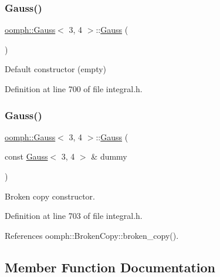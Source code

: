 \subsubsection{\texorpdfstring{Gauss()}{Gauss()}\hspace{0.1cm}{\footnotesize\ttfamily [1/2]}}
{\footnotesize\ttfamily \hyperlink{classoomph_1_1Gauss}{oomph\+::\+Gauss}$<$ 3, 4 $>$\+::\hyperlink{classoomph_1_1Gauss}{Gauss} (\begin{DoxyParamCaption}{ }\end{DoxyParamCaption})\hspace{0.3cm}{\ttfamily [inline]}}



Default constructor (empty) 



Definition at line 700 of file integral.\+h.

\mbox{\label{classoomph_1_1Gauss_3_013_00_014_01_4_a1e3cc4f3bd8e8d1d684671b80561647d}} 
\subsubsection{\texorpdfstring{Gauss()}{Gauss()}\hspace{0.1cm}{\footnotesize\ttfamily [2/2]}}
{\footnotesize\ttfamily \hyperlink{classoomph_1_1Gauss}{oomph\+::\+Gauss}$<$ 3, 4 $>$\+::\hyperlink{classoomph_1_1Gauss}{Gauss} (\begin{DoxyParamCaption}\item[{const \hyperlink{classoomph_1_1Gauss}{Gauss}$<$ 3, 4 $>$ \&}]{dummy }\end{DoxyParamCaption})\hspace{0.3cm}{\ttfamily [inline]}}



Broken copy constructor. 



Definition at line 703 of file integral.\+h.



References oomph\+::\+Broken\+Copy\+::broken\+\_\+copy().



\subsection{Member Function Documentation}
\mbox{\label{classoomph_1_1Gauss_3_013_00_014_01_4_a83d2fbea774a2d51051353e818cbb092}} 
